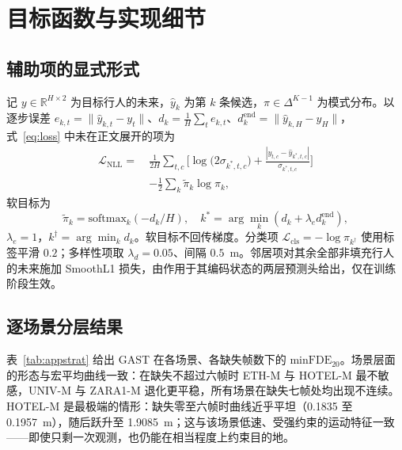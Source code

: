 \appendix
\section{目标函数与实现细节}
\label{app:impl}

\subsection{辅助项的显式形式}
\label{app:loss}

记 $y\in\mathbb{R}^{H\times2}$ 为目标行人的未来，$\hat{y}_{k}$ 为第 $k$ 条候选，$\pi\in\Delta^{K-1}$ 为模式分布。以逐步误差 $e_{k,t}=\|\hat{y}_{k,t}-y_{t}\|$、$d_{k}=\frac{1}{H}\sum_{t}e_{k,t}$、$d^{\mathrm{end}}_{k}=\|\hat{y}_{k,H}-y_{H}\|$，式~\eqref{eq:loss} 中未在正文展开的项为
\begin{equation}
\begin{aligned}
\mathcal{L}_{\mathrm{NLL}}=\ &\frac{1}{2H}\sum_{t,c}\Big[\log\big(2\sigma_{k^{\ast},t,c}\big)+\frac{|y_{t,c}-\hat{y}_{k^{\ast},t,c}|}{\sigma_{k^{\ast},t,c}}\Big]\\
&-\frac{1}{2}\sum_{k}\tilde{\pi}_{k}\log\pi_{k},
\end{aligned}
\label{eq:nll}
\end{equation}
软目标为
\begin{equation}
\tilde{\pi}_{k}=\mathrm{softmax}_{k}(-d_{k}/H),\quad
k^{\ast}=\arg\min_{k}(d_{k}+\lambda_{e}d^{\mathrm{end}}_{k}),
\label{eq:softtarget}
\end{equation}
$\lambda_{e}=1$，$k^{\dagger}=\arg\min_{k}d_{k}$。软目标不回传梯度。分类项 $\mathcal{L}_{\mathrm{cls}}=-\log\pi_{k^{\dagger}}$ 使用标签平滑 $0.2$；多样性项取 $\lambda_{d}=0.05$、间隔 $0.5$~m。邻居项对其余全部非填充行人的未来施加 SmoothL1 损失，由作用于其编码状态的两层预测头给出，仅在训练阶段生效。

\subsection{逐场景分层结果}
\label{app:strat}

表~\ref{tab:appstrat} 给出 GAST 在各场景、各缺失帧数下的 $\mathrm{minFDE}_{20}$。场景层面的形态与宏平均曲线一致：在缺失不超过六帧时 ETH-M 与 HOTEL-M 最不敏感，UNIV-M 与 ZARA1-M 退化更平稳，所有场景在缺失七帧处均出现不连续。HOTEL-M 是最极端的情形：缺失零至六帧时曲线近乎平坦（0.1835 至 0.1957~m），随后跃升至 1.9085~m；这与该场景低速、受强约束的运动特征一致——即使只剩一次观测，也仍能在相当程度上约束目的地。

